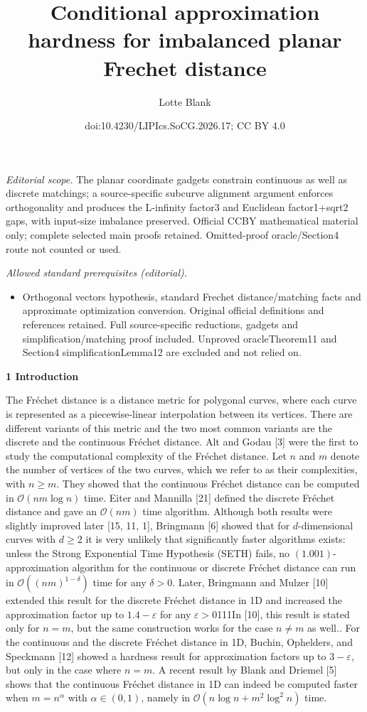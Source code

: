 \documentclass[10pt,a4paper]{article}
\title{Conditional approximation hardness for imbalanced planar Frechet distance}
\author{Lotte Blank}
\date{doi:10.4230/LIPIcs.SoCG.2026.17; CC BY 4.0}
\begin{document}
\maketitle
\noindent\textit{Editorial scope.} The planar coordinate gadgets constrain continuous as well as discrete matchings; a source-specific subcurve alignment argument enforces orthogonality and produces the L-infinity factor3 and Euclidean factor1+sqrt2 gaps, with input-size imbalance preserved. Official CCBY mathematical material only; complete selected main proofs retained. Omitted-proof oracle/Section4 route not counted or used.\par\medskip
\noindent\textit{Allowed standard prerequisites (editorial).}\begin{itemize}
\item Orthogonal vectors hypothesis, standard Frechet distance/matching facts and approximate optimization conversion. Original official definitions and references retained. Full source-specific reductions, gadgets and simplification/matching proof included. Unproved oracleTheorem11 and Section4 simplificationLemma12 are excluded and not relied on.
\end{itemize}\medskip
\par\medskip\noindent\textbf{1 Introduction}\par
The Fréchet distance is a distance metric for polygonal curves, where each curve is represented as a piecewise-linear interpolation between its vertices. There are different variants of this metric and the two most common variants are the discrete and the continuous Fréchet distance. Alt and Godau [3] were the first to study the computational complexity of the Fréchet distance. Let $n$ and $m$ denote the number of vertices of the two curves, which we refer to as their complexities, with $n\geq m$. They showed that the continuous Fréchet distance can be computed in $\mathcal{O}(nm\log n)$ time. Eiter and Mannilla [21] defined the discrete Fréchet distance and gave an $\mathcal{O}(nm)$ time algorithm. Although both results were slightly improved later [15, 11, 1], Bringmann [6] showed that for $d$-dimensional curves with $d\geq 2$ it is very unlikely that significantly faster algorithms exists: unless the Strong Exponential Time Hypothesis (SETH) fails, no $(1.001)$-approximation algorithm for the continuous or discrete Fréchet distance can run in $\mathcal{O}((nm)^{1-\delta})$ time for any $\delta>0$. Later, Bringmann and Mulzer [10] extended this result for the discrete Fréchet distance in 1D and increased the approximation factor up to $1.4-\varepsilon$ for any $\varepsilon>0$111In [10], this result is stated only for $n=m$, but the same construction works for the case $n\neq m$ as well.. For the continuous and the discrete Fréchet distance in 1D, Buchin, Ophelders, and Speckmann [12] showed a hardness result for approximation factors up to $3-\varepsilon$, but only in the case where $n=m$. A recent result by Blank and Driemel [5] shows that the continuous Fréchet distance in 1D can indeed be computed faster when $m=n^{\alpha}$ with $\alpha\in(0,1)$, namely in $\mathcal{O}(n\log n+m^{2}\log^{2}n)$ time.
\end{document}
